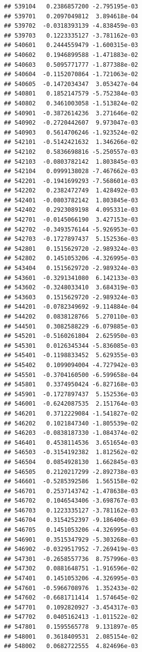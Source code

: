 \begin{frame}[fragile]
\begin{verbatim}
## 539104   0.2386857200 -2.795195e-03
## 539701   0.2097049812  3.894618e-04
## 539702  -0.0318393139 -4.838459e-03
## 539703   0.1223335127 -3.781162e-03
## 540601   0.2444559479 -1.600315e-03
## 540602   0.1946899588 -1.471883e-02
## 540603   0.5095771777 -1.877388e-02
## 540604  -0.1152070864 -1.721063e-02
## 540605  -0.1472034347  3.053427e-04
## 540801   0.1852147579 -5.752384e-03
## 540802   0.3461003058 -1.513824e-02
## 540901  -0.3872614236  3.271646e-02
## 540902  -0.2720442607  9.973047e-03
## 540903   0.5614706246 -1.923524e-02
## 542101  -0.5142421632  1.346266e-02
## 542102   0.5836698816 -5.250557e-03
## 542103  -0.0803782142  1.803845e-03
## 542104   0.0999138028 -7.467662e-03
## 542201  -0.1941699293 -7.568601e-03
## 542202   0.2382472749  1.428492e-03
## 542401  -0.0803782142  1.803845e-03
## 542402   0.2923089198  4.095331e-03
## 542701  -0.0145066190  3.427153e-03
## 542702  -0.3493576144 -5.926953e-03
## 542703  -0.1727897437  5.152536e-03
## 542801   0.1515629720 -2.989324e-03
## 542802   0.1451053206 -4.326995e-03
## 543404   0.1515629720 -2.989324e-03
## 543601  -0.3291341080  6.142133e-03
## 543602  -0.3248033410  3.684319e-03
## 543603   0.1515629720 -2.989324e-03
## 544201  -0.0782349692 -9.114884e-04
## 544202   0.0838128766  5.270110e-03
## 544501   0.3082588229 -6.079885e-03
## 545201  -0.5160261804  2.625950e-03
## 545301   0.0126345344 -5.836085e-03
## 545401  -0.1198833452  5.629355e-03
## 545402   0.1099094004 -4.727942e-03
## 545501  -0.3704160500 -6.599658e-04
## 545801   0.3374950424 -6.827168e-03
## 545901  -0.1727897437  5.152536e-03
## 546001  -0.6242087535  2.151764e-03
## 546201   0.3712229084 -1.541827e-02
## 546202   0.1021847340 -1.805539e-02
## 546203  -0.0838187330 -1.084374e-02
## 546401   0.4538114536  3.651654e-03
## 546503  -0.3154192382  1.812562e-02
## 546504   0.0854928130  1.662845e-03
## 546505   0.2120217299 -2.892738e-03
## 546601  -0.5285392586  1.565158e-02
## 546701   0.2537143742 -1.478638e-03
## 546702   0.1046543406 -3.698767e-03
## 546703   0.1223335127 -3.781162e-03
## 546704   0.3154252397 -9.186406e-03
## 546705   0.1451053206 -4.326995e-03
## 546901   0.3515347929 -5.303268e-03
## 546902  -0.0329517952 -7.269419e-03
## 547301  -0.2658557736  8.757996e-03
## 547302   0.0881648751 -1.916596e-02
## 547401   0.1451053206 -4.326995e-03
## 547601  -0.5966708976  1.352433e-02
## 547602  -0.6681711414  1.574645e-02
## 547701   0.1092820927 -3.454317e-03
## 547702   0.0405162413 -1.011522e-02
## 547801   0.1595565778  9.131897e-05
## 548001   0.3618409531  2.085154e-02
## 548002   0.0682722555  4.824696e-03

\end{verbatim}
\end{frame}
